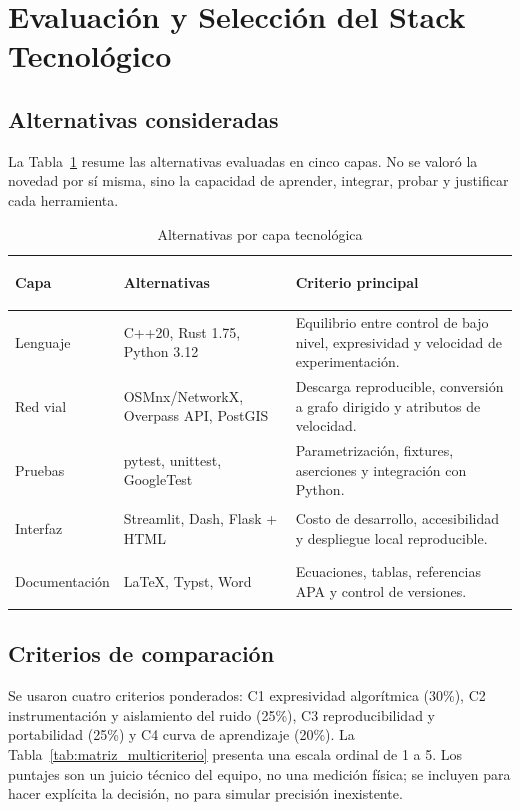 \section{Evaluación y Selección del Stack Tecnológico}
\label{sec:stack}

\subsection{Alternativas consideradas}
La Tabla~\ref{tab:alternativas_stack} resume las alternativas evaluadas en cinco capas. No se valoró la novedad por sí misma, sino la capacidad de aprender, integrar, probar y justificar cada herramienta.

\begin{table}[H]
    \centering
    \fontsize{9.5}{11.5}\selectfont
    \renewcommand{\arraystretch}{1.12}
    \caption{Alternativas por capa tecnológica}
    \label{tab:alternativas_stack}
    \begin{tabularx}{\textwidth}{@{}>{\bfseries\raggedright\arraybackslash}p{3.0cm} >{\raggedright\arraybackslash}p{4.4cm} >{\raggedright\arraybackslash}X@{}}
        \toprule
        \textbf{Capa} & \textbf{Alternativas} & \textbf{Criterio principal} \\
        \midrule
        Lenguaje & C++20, Rust 1.75, Python 3.12 & Equilibrio entre control de bajo nivel, expresividad y velocidad de experimentación. \\
        Red vial & OSMnx/NetworkX, Overpass API, PostGIS & Descarga reproducible, conversión a grafo dirigido y atributos de velocidad. \\
        Pruebas & pytest, unittest, GoogleTest & Parametrización, fixtures, aserciones y integración con Python. \\
        Interfaz & Streamlit, Dash, Flask + HTML & Costo de desarrollo, accesibilidad y despliegue local reproducible. \\
        Documentación & LaTeX, Typst, Word & Ecuaciones, tablas, referencias APA y control de versiones. \\
        \bottomrule
    \end{tabularx}
\end{table}

\subsection{Criterios de comparación}
Se usaron cuatro criterios ponderados: C1 expresividad algorítmica (30\%), C2 instrumentación y aislamiento del ruido (25\%), C3 reproducibilidad y portabilidad (25\%) y C4 curva de aprendizaje (20\%). La Tabla~\ref{tab:matriz_multicriterio} presenta una escala ordinal de 1 a 5. Los puntajes son un juicio técnico del equipo, no una medición física; se incluyen para hacer explícita la decisión, no para simular precisión inexistente.

